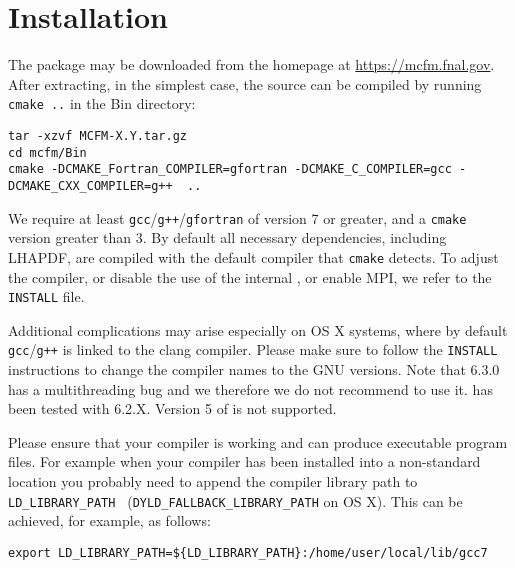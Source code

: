 \section{Installation}
\label{sec:Installation}

The \MCFM{} package may be downloaded from the \MCFM{} homepage at \url{https://mcfm.fnal.gov}.
After extracting, in the simplest case, the source can be compiled by running \texttt{cmake ..} in 
the Bin directory:
\begin{lstlisting}
tar -xzvf MCFM-X.Y.tar.gz
cd mcfm/Bin
cmake -DCMAKE_Fortran_COMPILER=gfortran -DCMAKE_C_COMPILER=gcc -DCMAKE_CXX_COMPILER=g++  ..
\end{lstlisting}
We require at least \texttt{gcc}/\texttt{g++}/\texttt{gfortran} of version 7 or 
greater, and a \texttt{cmake} 
version greater than 3. By default all necessary dependencies, including LHAPDF, are compiled with
the default compiler that \texttt{cmake} detects. To adjust the compiler, or disable the use of the 
internal \LHAPDF{}, or enable {\abbrev MPI}, we refer to the \texttt{INSTALL} file.

Additional complications may arise especially on OS X systems, where by default 
\texttt{gcc}/\texttt{g++}
is linked to the clang compiler. Please make sure to follow the \texttt{INSTALL} instructions to
change the compiler names to the GNU versions. Note that \LHAPDF{} 6.3.0 has a multithreading
bug and we therefore we do not recommend to use it. \MCFM{} has been tested with \LHAPDF{} 6.2.X. 
Version 5 of \LHAPDF{} is not supported.

Please ensure that your compiler is working and can produce executable program
files. For example when your compiler has been installed into a non-standard
location you probably need to append the compiler library path to {\tt
LD\_LIBRARY\_PATH } ({\tt DYLD\_FALLBACK\_LIBRARY\_PATH} on OS X).  This can be
achieved, for example, as follows:
\begin{verbatim}
export LD_LIBRARY_PATH=${LD_LIBRARY_PATH}:/home/user/local/lib/gcc7
\end{verbatim}

